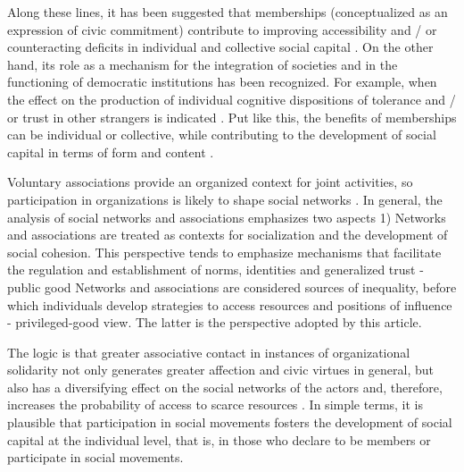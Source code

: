 Along these lines, it has been suggested that memberships (conceptualized as an expression of civic commitment) contribute to improving accessibility and / or counteracting deficits in individual and collective social capital \parencite{benton_uniters_2016,small_villa_2004,son_social_2008}. On the other hand, its role as a mechanism for the integration of societies and in the functioning of democratic institutions has been recognized. For example, when the effect on the production of individual cognitive dispositions of tolerance and / or trust in other strangers is indicated \parencite{cote_social_2015,putnam_bowling_2000,tocqueville_democracy_1980} . Put like this, the benefits of memberships can be individual or collective, while contributing to the development of social capital in terms of form and content \parencite{moody_building_2009}. 
\bigskip

Voluntary associations provide an organized context for joint activities, so participation in organizations is likely to shape social networks \parencite{feld_focused_1981,mcpherson_social_1992}. In general, the analysis of social networks and associations emphasizes two aspects 1) Networks and associations are treated as contexts for socialization and the development of social cohesion. This perspective tends to emphasize mechanisms that facilitate the regulation and establishment of norms, identities and generalized trust \parencite{glanville_voluntary_2004,glanville_why_2016,paxton_association_2007,paxton_trust_2018} - public good Networks and associations are considered sources of inequality, before which individuals develop strategies to access resources and positions of influence \parencite{bekkers_social_2008} - privileged-good view. The latter is the perspective adopted by this article.
\bigskip

The logic is that greater associative contact in instances of organizational solidarity not only generates greater affection and civic virtues in general, but also has a diversifying effect on the social networks of the actors and, therefore, increases the probability of access to scarce resources \parencite{diani_social_1997,malinick_network_2013,tindall_network_2012,benton_uniters_2016}. In simple terms, it is plausible that participation in social movements fosters the development of social capital at the individual level, that is, in those who declare to be members or participate in social movements. 
\bigskip

